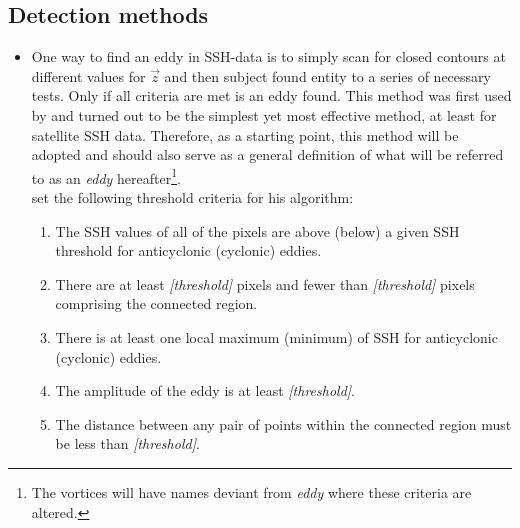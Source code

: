 \subsection{Detection methods} \label{subsec:detectmethods}
\begin{itemize}
	\item
	One way to find an eddy in SSH-data is to simply scan for closed contours at different values for $\vec{z}$ and then subject found entity to a series of necessary tests. Only if all criteria are met is an eddy found. This method was first used by \cite{Chelton2011} and turned out to be the simplest yet most effective method, at least for satellite SSH data. Therefore, as a starting point, this method will be adopted and should also serve as a general definition of what will be referred to as an \textit{eddy} hereafter\footnote{The vortices will have names deviant from \textit{eddy} where these criteria are altered.}.\\
	\citeauthor{Chelton2011} set the following threshold criteria for his algorithm:
\begin{enumerate}
\item
The SSH values of all of the pixels are above (below) a given SSH threshold for anticyclonic (cyclonic) eddies.
\item
There are at least \textit{[threshold]} pixels and fewer than \textit{[threshold]} pixels comprising the connected region.
\item
There is at least one local maximum (minimum) of SSH for anticyclonic (cyclonic) eddies.
\item
 The amplitude of the eddy is at least \textit{[threshold]}.
\item
The distance between any pair of points within the connected region must be less than \textit{[threshold]}.
\end{enumerate}


\end{itemize}

